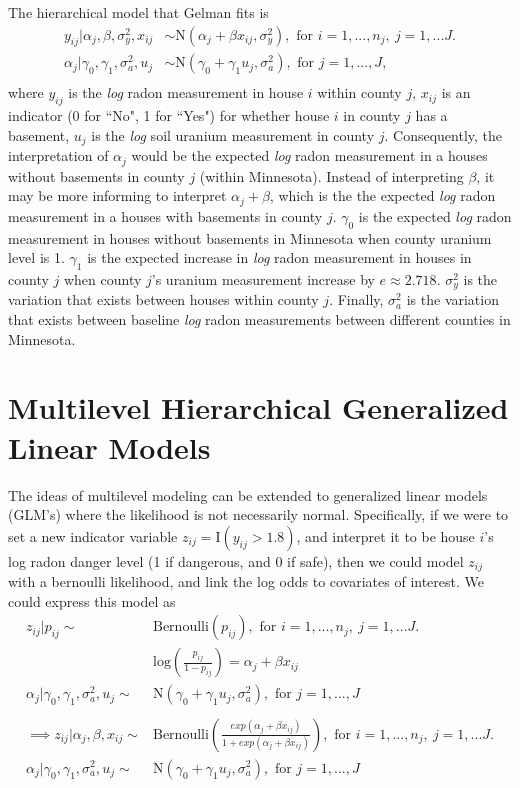 \documentclass{article}
\begin{document}
\noindent
The hierarchical model that Gelman fits is
\begin{align*}
  y_{ij}|\alpha_j,\beta,\sigma_y^2,x_{ij} &\sim \text{N}(\alpha_j + \beta
      x_{ij},\sigma_y^2),\text{ for }i=1,...,n_j,~j=1,...J.\\
  \alpha_{j}|\gamma_0,\gamma_1,\sigma_a^2,u_j &\sim \text{N}(\gamma_0 +
      \gamma_1 u_j,\sigma_a^2),\text{ for }j=1,...,J,\\
\end{align*}
where $y_{ij}$ is the \textit{log} radon measurement in house $i$ within county
$j$, $x_{ij}$ is an indicator (0 for ``No", 1 for ``Yes") for whether house $i$
in county $j$ has a basement, $u_j$ is the \textit{log} soil uranium
measurement in county $j$. Consequently, the interpretation of $\alpha_j$ would
be the expected \textit{log} radon measurement in a houses without basements in
county $j$ (within Minnesota). Instead of interpreting $\beta$, it may be more
informing to interpret $\alpha_j+\beta$, which is the the expected \textit{log}
radon measurement in a houses with basements in county $j$. $\gamma_0$ is the
expected \textit{log} radon measurement in houses without basements in
Minnesota when county uranium level is 1. $\gamma_1$ is the expected increase
in \textit{log} radon measurement in houses in county $j$ when county $j$'s
uranium measurement increase by $e\approx 2.718$. $\sigma_y^2$ is the variation
that exists between houses within county $j$. Finally, $\sigma_a^2$ is the
variation that exists between baseline \textit{log} radon measurements between
different counties in Minnesota.\\

\section{Multilevel Hierarchical Generalized Linear Models}
The ideas of multilevel modeling can be extended to generalized linear models
(GLM's) where the likelihood is not necessarily normal. Specifically, if we
were to set a new indicator variable $z_{ij} = \text{I}(y_{ij}>1.8)$, and interpret
it to be house $i$'s log radon danger level (1 if dangerous, and 0 if safe), then
we could model $z_{ij}$ with a bernoulli likelihood, and link the log odds
to covariates of interest. We could express this model as
\begin{align*}
  z_{ij}|p_{ij} \sim & \text{Bernoulli}(p_{ij}),\text{ for }i=1,...,n_j,~j=1,...J.\\
  &\text{log}\left(\frac{p_{ij}}{1-p_{ij}}\right) = \alpha_j+\beta x_{ij}\\
  \alpha_{j}|\gamma_0,\gamma_1,\sigma_a^2,u_j \sim & \text{N}(\gamma_0 +
      \gamma_1 u_j,\sigma_a^2),\text{ for }j=1,...,J\\
  \\
  \implies
  z_{ij}|\alpha_j,\beta,x_{ij} \sim &
      \text{Bernoulli}\left(\frac{exp(\alpha_j+\beta x_{ij})}{1+exp(\alpha_j+\beta
      x_{ij})}\right),\text{ for }i=1,...,n_j,~j=1,...J.\\
  \alpha_{j}|\gamma_0,\gamma_1,\sigma_a^2,u_j \sim & \text{N}(\gamma_0 +
      \gamma_1 u_j,\sigma_a^2),\text{ for }j=1,...,J\\
\end{align*}
\end{document}

